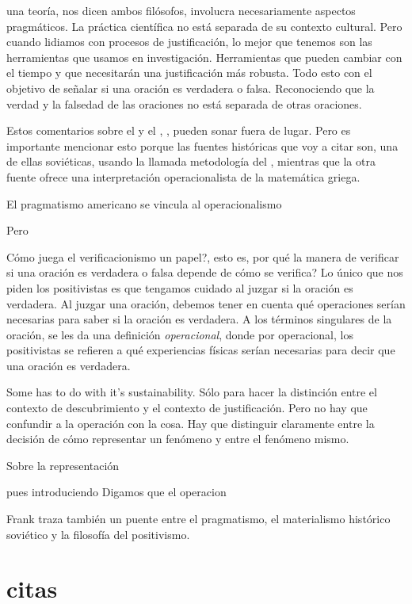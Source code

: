 una teoría, nos dicen ambos filósofos, involucra necesariamente aspectos pragmáticos.
La práctica científica no está separada de su contexto cultural.
Pero cuando lidiamos con procesos de justificación, lo mejor que tenemos son las herramientas que usamos en investigación.
Herramientas que pueden cambiar con el tiempo y que necesitarán una justificación más robusta.
Todo esto con el objetivo de señalar si una oración es verdadera o falsa.
Reconociendo que la verdad y la falsedad de las oraciones no está separada de otras oraciones.

Estos comentarios sobre el  y el ,
, pueden sonar fuera de lugar.
Pero es importante mencionar esto porque las fuentes históricas que voy a citar son, una de ellas soviéticas, usando la llamada metodología del , mientras que la otra fuente ofrece una interpretación operacionalista de la matemática griega.

El pragmatismo americano se vincula al operacionalismo

Pero

Cómo juega el verificacionismo un papel?, esto es, por qué la manera de verificar si una oración es verdadera o falsa depende de cómo se verifica?
Lo único que nos piden los positivistas es que tengamos cuidado al juzgar si la oración es verdadera.
Al juzgar una oración, debemos tener en cuenta qué operaciones serían necesarias para saber si la oración es verdadera.
A los términos singulares de la oración, se les da una definición \emph{operacional}, donde por operacional, los positivistas se refieren a qué experiencias físicas serían necesarias para decir que una oración es verdadera.

Some has to do with it's sustainability.
Sólo para hacer la distinción entre el contexto de descubrimiento y el contexto de justificación.
Pero no hay que confundir a la operación con la cosa.
Hay que distinguir claramente entre la decisión de cómo representar un fenómeno y entre el fenómeno mismo.

Sobre la representación

pues introduciendo
Digamos que el operacion

Frank traza también un puente entre el pragmatismo, el materialismo histórico soviético y la filosofía del positivismo.


\section{citas}



